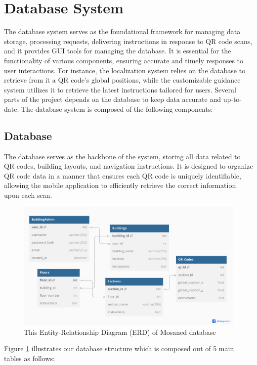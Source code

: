 \section{Database System}

The database system serves as the foundational framework for managing data storage, processing requests, delivering instructions in response to QR code scans, and it provides GUI tools for managing the database. It is essential for the functionality of various components, ensuring accurate and timely responses to user interactions. For instance, the localization system relies on the database to retrieve from it a QR code's global positions, while the customizable guidance system utilizes it to retrieve the latest instructions tailored for users. Several parts of the project depends on the database to keep data accurate and up-to-date. The database system is composed of the following components:
\subsection{Database}

The database serves as the backbone of the system, storing all data related to QR codes, building layouts, and navigation instructions. It is designed to organize QR code data in a manner that ensures each QR code is uniquely identifiable, allowing the mobile application to efficiently retrieve the correct information upon each scan.

\begin{figure}[h]
	\centering
	\includegraphics[width=1\linewidth]{assets/ch3/our_ERD}
	\caption{This Entity-Relationship Diagram (ERD) of Mosaned database}
	\label{fig:our_ERD}
\end{figure}

Figure \ref{fig:our_ERD} illustrates our database structure which is composed out of 5 main tables as follows:


